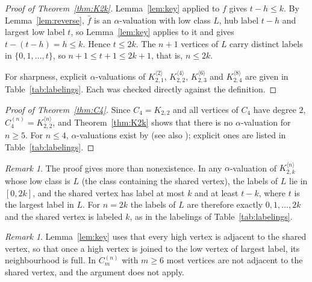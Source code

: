 \documentclass[11pt]{amsart}
\theoremstyle{definition}
\theoremstyle{remark}
\newtheorem{remark}[theorem]{Remark}
\begin{document}
\begin{proof}[Proof of Theorem~\ref{thm:K2k}]
Lemma~\ref{lem:key} applied to $f$ gives $t - h \le k$. By Lemma~\ref{lem:reverse}, $\bar f$ is an $\alpha$-valuation with low class $L$, hub label $t - h$ and largest low label $t$, so Lemma~\ref{lem:key} applies to it and gives $t - (t - h) = h \le k$. Hence $t \le 2k$. The $n+1$ vertices of $L$ carry distinct labels in $\{0, 1, \dots, t\}$, so $n + 1 \le t + 1 \le 2k+1$, that is, $n \le 2k$.

For sharpness, explicit $\alpha$-valuations of $K_{2,1}^{\langle 2\rangle}$, $K_{2,2}^{\langle 4\rangle}$, $K_{2,3}^{\langle 6\rangle}$ and $K_{2,4}^{\langle 8\rangle}$ are given in Table~\ref{tab:labelings}. Each was checked directly against the definition.
\end{proof}

\begin{proof}[Proof of Theorem~\ref{thm:C4}]
Since $C_4 = K_{2,2}$ and all vertices of $C_4$ have degree $2$, $C_4^{(n)} = K_{2,2}^{\langle n\rangle}$, and Theorem~\ref{thm:K2k} shows that there is no $\alpha$-valuation for $n \ge 5$. For $n \le 4$, $\alpha$-valuations exist by \cite[Theorem~3.8]{FIM} (see also \cite{BM2019}); explicit ones are listed in Table~\ref{tab:labelings}.
\end{proof}

\begin{remark}
The proof gives more than nonexistence. In any $\alpha$-valuation of $K_{2,k}^{\langle n\rangle}$ whose low class is $L$ (the class containing the shared vertex), the labels of $L$ lie in $[0,2k]$, and the shared vertex has label at most $k$ and at least $t - k$, where $t$ is the largest label in $L$. For $n = 2k$ the labels of $L$ are therefore exactly $0, 1, \dots, 2k$ and the shared vertex is labeled $k$, as in the labelings of Table~\ref{tab:labelings}.
\end{remark}

\begin{remark}\label{rem:structure}
Lemma~\ref{lem:key} uses that every high vertex is adjacent to the shared vertex, so that once a high vertex is joined to the low vertex of largest label, its neighbourhood is full. In $C_m^{(n)}$ with $m \ge 6$ most vertices are not adjacent to the shared vertex, and the argument does not apply.
\end{remark}
\end{document}
